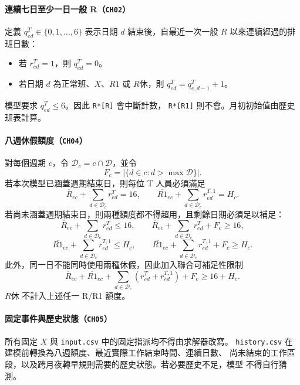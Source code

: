 \documentclass[12pt]{article}
\begin{document}
\paragraph{連續七日至少一日一般 R（\texttt{CH02}）}

定義 \(q^{T}_{ed}\in\{0,1,\ldots,6\}\) 表示日期 \(d\) 結束後，自最近一次一般
\(R\) 以來連續經過的排班日數：

\begin{itemize}
  \item 若 \(r^{T}_{ed}=1\)，則 \(q^{T}_{ed}=0\)。
  \item 若日期 \(d\) 為正常班、\(X\)、\(R1\) 或 \(R休\)，則
    \(q^{T}_{ed}=q^{T}_{e,d-1}+1\)。
\end{itemize}

模型要求 \(q^{T}_{ed}\leq 6\)。因此 \texttt{R*[R]} 會中斷計數，
\texttt{R*[R1]} 則不會。月初初始值由歷史班表計算。

\paragraph{八週休假額度（\texttt{CH04}）}

對每個週期 \(c\)，令 \(\mathcal{D}_c=c\cap\mathcal{D}\)，並令
\[
  F_c=|\{d\in c:d>\max\mathcal{D}\}|.
\]
若本次模型已涵蓋週期結束日，則每位 T 人員必須滿足
\[
  \overline{R}_{ec}+\sum_{d\in\mathcal{D}_c}r^{T}_{ed}=16,
  \qquad
  \overline{R1}_{ec}+\sum_{d\in\mathcal{D}_c}r^{T,1}_{ed}=H_c.
\]
若尚未涵蓋週期結束日，則兩種額度都不得超用，且剩餘日期必須足以補足：
\[
  \overline{R}_{ec}+\sum_{d\in\mathcal{D}_c}r^{T}_{ed}\leq16,
  \qquad
  \overline{R}_{ec}+\sum_{d\in\mathcal{D}_c}r^{T}_{ed}+F_c\geq16,
\]
\[
  \overline{R1}_{ec}+\sum_{d\in\mathcal{D}_c}r^{T,1}_{ed}\leq H_c,
  \qquad
  \overline{R1}_{ec}+\sum_{d\in\mathcal{D}_c}r^{T,1}_{ed}+F_c\geq H_c.
\]
此外，同一日不能同時使用兩種休假，因此加入聯合可補足性限制
\[
  \overline{R}_{ec}+\overline{R1}_{ec}
  +\sum_{d\in\mathcal{D}_c}(r^{T}_{ed}+r^{T,1}_{ed})+F_c
  \geq16+H_c.
\]
\(R休\) 不計入上述任一 R/R1 額度。

\paragraph{固定事件與歷史狀態（\texttt{CH05}）}

所有固定 \(X\) 與 \texttt{input.csv} 中的固定指派均不得由求解器改寫。
\texttt{history.csv} 在建模前轉換為八週額度、最近實際工作結束時間、連續日數、
尚未結束的工作區段，以及跨月夜轉早規則需要的歷史狀態。若必要歷史不足，模型
不得自行猜測。
\end{document}
